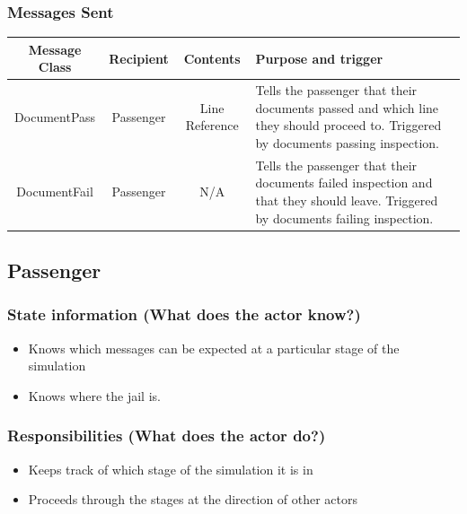 \documentclass[12pt,letterpaper]{scrartcl}
\begin{document}
\subsubsection*{Messages Sent}
\begin{center}
    \begin{tabulary}{\textwidth}{|c|c|c|L|}
        \hline
        Message Class & Recipient & Contents & Purpose and trigger \\
        \hline
        DocumentPass & Passenger & Line Reference & Tells the passenger that their documents passed and which line they should proceed to. Triggered by documents passing inspection. \\
        DocumentFail & Passenger & N/A & Tells the passenger that their documents failed inspection and that they should leave. Triggered by documents failing inspection. \\
        \hline
    \end{tabulary}
\end{center}

\subsection*{Passenger}
\subsubsection*{State information (What does the actor know?)}
\begin{itemize}
    \item Knows which messages can be expected at a particular stage of the simulation
    \item Knows where the jail is.
\end{itemize}

\subsubsection*{Responsibilities (What does the actor do?)}
\begin{itemize}
    \item Keeps track of which stage of the simulation it is in
    \item Proceeds through the stages at the direction of other actors
\end{itemize}
\end{document}
